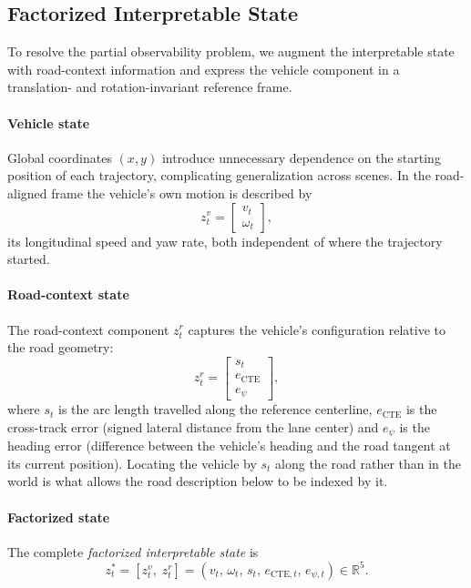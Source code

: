 \documentclass[preprint,12pt]{elsarticle}
\newcommand{\zv}{z^{v}}      %
\newcommand{\zr}{z^{r}}      %
\newcommand{\zstar}{z^{*}}   %
\begin{document}
\subsection{Factorized Interpretable State}\label{sec:factorized_state}

To resolve the partial observability problem, we augment the interpretable state
with road-context information and express the vehicle component in a translation-
and rotation-invariant reference frame.

\paragraph{Vehicle state}
Global coordinates $(x, y)$ introduce unnecessary dependence on the starting
position of each trajectory, complicating generalization across scenes.
In the road-aligned frame the vehicle's own motion is described by
\begin{equation}
    \zv_t =
    \begin{bmatrix}
        v_t \\ \omega_t
    \end{bmatrix},
    \label{eq:vehicle_rel}
\end{equation}
its longitudinal speed and yaw rate, both independent of where the trajectory
started.

\paragraph{Road-context state}
The road-context component $\zr_t$ captures the vehicle's configuration relative to
the road geometry:
\begin{equation}
    \zr_t =
    \begin{bmatrix}
        s_t \\ e_{\mathrm{CTE}} \\ e_{\psi}
    \end{bmatrix},
    \label{eq:road_ctx}
\end{equation}
where $s_t$ is the arc length travelled along the reference centerline,
$e_{\mathrm{CTE}}$ is the cross-track error (signed lateral distance from the lane
center) and $e_{\psi}$ is the heading error (difference between the vehicle's
heading and the road tangent at its current position).
Locating the vehicle by $s_t$ along the road rather than in the world is what
allows the road description below to be indexed by it.

\paragraph{Factorized state}
The complete \emph{factorized interpretable state} is
\begin{equation}
    \zstar_t = \left[ \zv_t,\; \zr_t \right]
             = \left( v_t,\, \omega_t,\, s_t,\, e_{\mathrm{CTE},t},\, e_{\psi,t} \right)
             \in \mathbb{R}^5 .
    \label{eq:factorized_state}
\end{equation}
\end{document}

